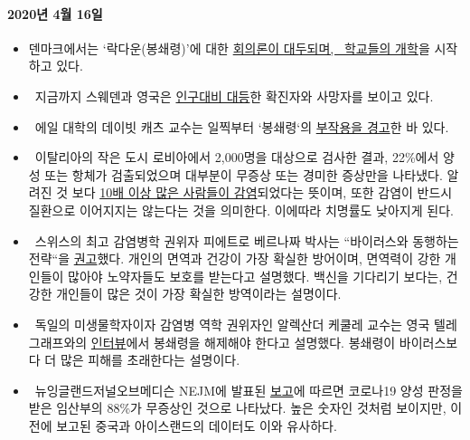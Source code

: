 \hypertarget{2020uxb144-4uxc6d4-16uxc77c}{%
\paragraph{2020년 4월 16일}\label{2020uxb144-4uxc6d4-16uxc77c}}

\begin{itemize}
\tightlist
\item
  덴마크에서는 `락다운(봉쇄령)'에 대한
  \href{https://jyllands-posten.dk/debat/breve/ECE12074246/vi-skulle-aldrig-have-trykket-paa-stopknappen/}{회의론이
  대두되며,~ 학교들의 개학}을 시작하고 있다.
\item
  ~지금까지 스웨덴과 영국은
  \href{http://www.theblogmire.com/a-comparison-of-lockdown-uk-with-non-lockdown-sweden/}{인구대비
  대등}한 확진자와 사망자를 보이고 있다. 
\item
  ~에일 대학의 데이빗 캐츠 교수는 일찍부터 `봉쇄령`의
  \href{https://www.youtube.com/watch?v=VK0Wtjh3HVA}{부작용을 경고}한 바
  있다. 
\item
  ~이탈리아의 작은 도시 로비아에서 2,000명을 대상으로 검사한 결과,
  22\%에서 양성 또는 항체가 검출되었으며 대부분이 무증상 또는 경미한
  증상만을 나타냈다. 알려진 것 보다
  \href{https://www.tgcom24.mediaset.it/cronaca/a-robbio-pv-il-22-ha-o-ha-avuto-il-coronavirus-ok-del-sindaco-ai-test-per-tutti_17285128-202002a.shtml}{10배
  이상 많은 사람들이 감염}되었다는 뜻이며, 또한 감염이 반드시 질환으로
  이어지지는 않는다는 것을 의미한다. 이에따라 치명률도 낮아지게 된다. 
\item
  ~스위스의 최고 감염병학 권위자 피에트로 베르나짜 박사는 ``바이러스와
  동행하는 전략``을
  \href{https://infekt.ch/2020/04/exitstrategie-lockdown/}{권고}했다.
  개인의 면역과 건강이 가장 확실한 방어이며, 면역력이 강한 개인들이
  많아야 노약자들도 보호를 받는다고 설명했다. 백신을 기다리기 보다는,
  건강한 개인들이 많은 것이 가장 확실한 방역이라는 설명이다.
\item
  ~독일의 미생물학자이자 감염병 역학 권위자인 알렉산더 케쿨레 교수는
  영국 텔레그래프와의
  \href{https://www.telegraph.co.uk/news/2020/04/11/german-scientist-predicted-european-epidemic-calls-end-lockdown/}{인터뷰}에서
  봉쇄령을 해제해야 한다고 설명했다. 봉쇄령이 바이러스보다 더 많은
  피해를 초래한다는 설명이다. 
\item
  ~뉴잉글랜드저널오브메디슨 NEJM에 발표된
  \href{https://www.nejm.org/doi/full/10.1056/NEJMc2009316}{보고}에
  따르면 코로나19 양성 판정을 받은 임산부의 88\%가 무증상인 것으로
  나타났다. 높은 숫자인 것처럼 보이지만, 이 전에 보고된 중국과
  아이스랜드의 데이터도 이와 유사하다.

\end{itemize}
